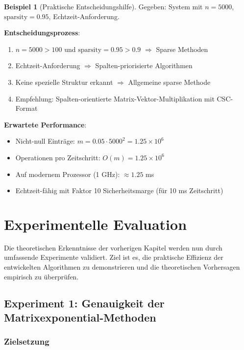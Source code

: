 \documentclass[a4paper,12pt]{report}
\theoremstyle{definition}
\newtheorem{beispiel}{Beispiel}
\begin{document}
	\begin{beispiel}[Praktische Entscheidungshilfe]
		Gegeben: System mit $n = 5000$, $\text{sparsity} = 0.95$, Echtzeit-Anforderung.
		
		\textbf{Entscheidungsprozess}:
		\begin{enumerate}
			\item $n = 5000 > 100$ und $\text{sparsity} = 0.95 > 0.9$ $\Rightarrow$ Sparse Methoden
			\item Echtzeit-Anforderung $\Rightarrow$ Spalten-priorisierte Algorithmen
			\item Keine spezielle Struktur erkannt $\Rightarrow$ Allgemeine sparse Methode
			\item Empfehlung: Spalten-orientierte Matrix-Vektor-Multiplikation mit CSC-Format
		\end{enumerate}
		
		\textbf{Erwartete Performance}:
		\begin{itemize}
			\item Nicht-null Einträge: $m = 0.05 \cdot 5000^2 = 1.25 \times 10^6$
			\item Operationen pro Zeitschritt: $O(m) = 1.25 \times 10^6$
			\item Auf modernem Prozessor (1 GHz): $\approx 1.25$ ms
			\item Echtzeit-fähig mit Faktor 10 Sicherheitsmarge (für 10 ms Zeitschritt)
		\end{itemize}
	\end{beispiel}
	
	\chapter{Experimentelle Evaluation}
	
	Die theoretischen Erkenntnisse der vorherigen Kapitel werden nun durch umfassende Experimente validiert. Ziel ist es, die praktische Effizienz der entwickelten Algorithmen zu demonstrieren und die theoretischen Vorhersagen empirisch zu überprüfen.
	
	\section{Experiment 1: Genauigkeit der Matrixexponential-Metho\-den}
	
	\subsection{Zielsetzung}
	
\end{document}
